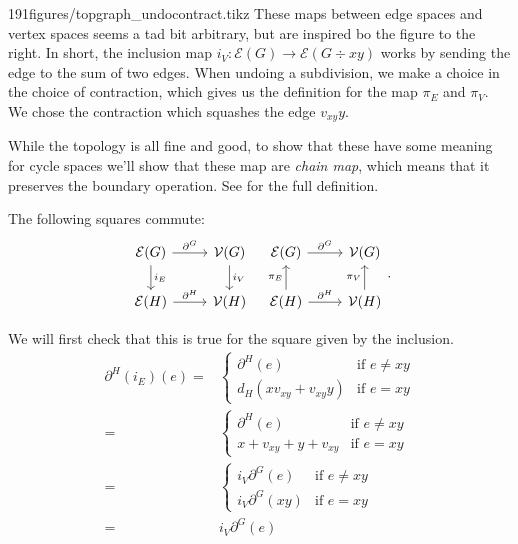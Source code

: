     
\begin{paragraphfigureenv}{191figures/topgraph_undocontract.tikz}
    These maps between edge spaces and vertex spaces seems a tad bit arbitrary, but are inspired bo the figure to the right. In short, the inclusion map $i_V: \mathcal E(G)\to \mathcal E(G\div xy)$ works by sending the edge  to the sum of two edges. 
     When undoing a subdivision, we make a choice in the choice of contraction, which gives us the definition for the map $\pi_E$ and $\pi_V$. 
    We chose the contraction which squashes the edge $v_{xy}y$. 
    \end{paragraphfigureenv}
    While the topology is all fine and good, to show that these have some meaning for cycle spaces we'll show that these map are \emph{chain map}, which means that it preserves the boundary operation. See  for the full definition.
    \begin{claim} The following squares commute: \label{claim:graphchainmap}
     \[\begin{tikzcd}
    \mathcal E(G)\arrow{r}{\partial^G} \arrow{d}{i_E} & \mathcal V(G) \arrow{d}{i_V}\\
    \mathcal E(H)\arrow{r}{\partial^H} & \mathcal V(H)
    \end{tikzcd}\;\;\;\begin{tikzcd}
    \mathcal E(G)\arrow{r}{\partial^G}& \mathcal V(G) \\
    \mathcal E(H)\arrow{r}{\partial^H} \arrow{u}{\pi_E}  & \mathcal V(H) \arrow{u}{\pi_V}
    \end{tikzcd}.\]
    \end{claim}
    We will first check that this is true for the square given by the inclusion.\\
    \begin{align*}
    \partial^H(i_E)(e)=& \left\{\begin{array}{ll} \partial^H(e) & \text{if $e\neq xy$}\\  d_H(xv_{xy}+v_{xy}y) & \text{if $e=xy$}\end{array}\right.\\
    =& \left\{\begin{array}{ll} \partial^H(e) & \text{if $e\neq xy$}\\  x+v_{xy}+y+v_{xy} & \text{if $e=xy$}\end{array}\right.\\=& \left\{\begin{array}{ll} i_V\partial^G(e) & \text{if $e\neq xy$}\\  i_V\partial^G(xy) & \text{if $e=xy$}\end{array}\right.\\
    =&i_V\partial^G(e)
    \end{align*}
